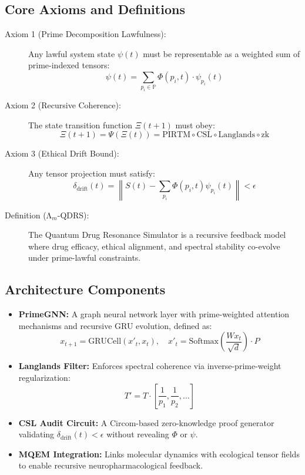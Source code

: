 \documentclass[12]{amsart}
\theoremstyle{plain}
\begin{document}
\subsection{Core Axioms and Definitions}
\begin{description}
  \item[Axiom 1 (Prime Decomposition Lawfulness):] Any lawful system state $\psi(t)$ must be representable as a weighted sum of prime-indexed tensors:
  \[
  \psi(t) = \sum_{p_i \in \mathbb{P}} \Phi(p_i, t) \cdot \psi_{p_i}(t)
  \]

  \item[Axiom 2 (Recursive Coherence):] The state transition function $\Xi(t+1)$ must obey:
  \[
  \Xi(t+1) = \Psi(\Xi(t)) = \text{PIRTM} \circ \text{CSL} \circ \text{Langlands} \circ \text{zk}
  \]

  \item[Axiom 3 (Ethical Drift Bound):] Any tensor projection must satisfy:
  \[
  \delta_{\text{drift}}(t) = \left\| S(t) - \sum_{p_i} \Phi(p_i,t)\psi_{p_i}(t) \right\| < \epsilon
  \]

  \item[Definition (Λ$_m$-QDRS):] The Quantum Drug Resonance Simulator is a recursive feedback model where drug efficacy, ethical alignment, and spectral stability co-evolve under prime-lawful constraints.
\end{description}

\subsection{Architecture Components}
\begin{itemize}
  \item \textbf{PrimeGNN:} A graph neural network layer with prime-weighted attention mechanisms and recursive GRU evolution, defined as:
  \[
  x_{t+1} = \text{GRUCell}(x'_t, x_t), \quad x'_t = \text{Softmax}\left(\frac{W x_t}{\sqrt{d}}\right) \cdot P
  \]

  \item \textbf{Langlands Filter:} Enforces spectral coherence via inverse-prime-weight regularization:
  \[
  T' = T \cdot \left[\frac{1}{p_1}, \frac{1}{p_2}, \ldots\right]
  \]

  \item \textbf{CSL Audit Circuit:} A Circom-based zero-knowledge proof generator validating $\delta_{\text{drift}}(t) < \epsilon$ without revealing $\Phi$ or $\psi$.

  \item \textbf{MQEM Integration:} Links molecular dynamics with ecological tensor fields to enable recursive neuropharmacological feedback.
\end{itemize}
\end{document}
